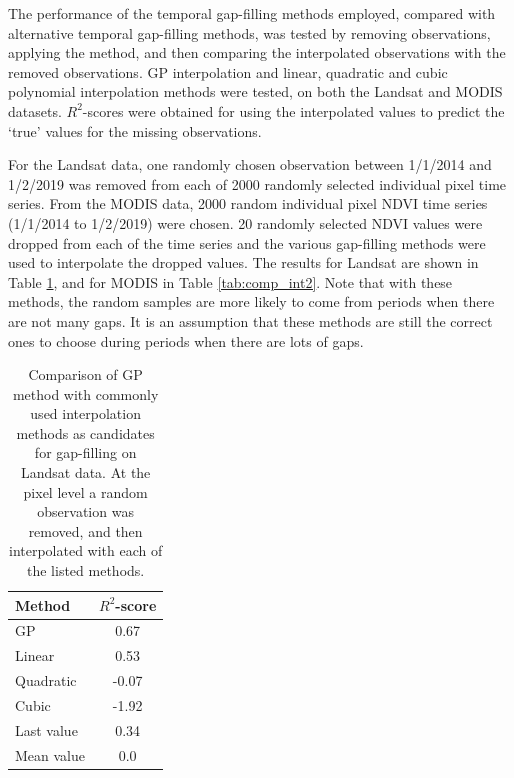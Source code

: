 \documentclass[review]{elsarticle}
\begin{document}
The performance of the temporal gap-filling methods employed, compared with alternative temporal gap-filling methods, was tested by removing observations, applying the method, and then comparing the interpolated observations with the removed observations. GP interpolation and linear, quadratic and cubic polynomial interpolation methods were tested, on both the Landsat and MODIS datasets. $R^2$-scores were obtained for using the interpolated values to predict the `true' values for the missing observations.


For the Landsat data, one randomly chosen observation between 1/1/2014 and 1/2/2019 was removed from each of 2000 randomly selected individual pixel time series.
From the MODIS data, 2000 random individual pixel NDVI time series (1/1/2014 to 1/2/2019) were chosen. 20 randomly selected NDVI values were dropped from each of the time series and the various gap-filling methods were used to interpolate the dropped values. The results for Landsat are shown in Table \ref{tab:comp_int}, and for MODIS in Table \ref{tab:comp_int2}. Note that with these methods, the random samples are more likely to come from periods when there are not many gaps. It is an assumption that these methods are still the correct ones to choose during periods when there are lots of gaps.



\begin{table}
	\caption{Comparison of GP method with commonly used interpolation methods as candidates for gap-filling on Landsat data. At the pixel level a random observation was removed, and then interpolated with each of the listed methods.} \label{tab:comp_int}
	\centering
	\begin{tabular}{lc} 
		\toprule
		\textbf{Method}  & \textbf{$R^2$-score} \\
		\midrule
		GP & 0.67 \\
		Linear & 0.53 \\
		Quadratic & -0.07 \\
		Cubic & -1.92 \\
		Last value & 0.34 \\
		Mean value & 0.0 \\
		\bottomrule
	\end{tabular}
\end{table}
\end{document}
